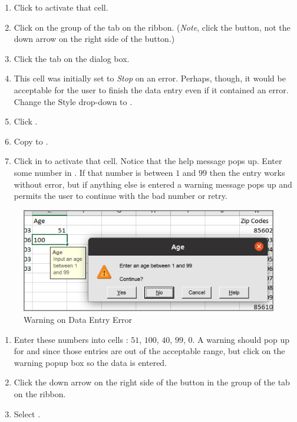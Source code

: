 \begin{enumerate}[resume]	
	\item Click  to activate that cell.
	\item Click  on the  group of the  tab on the ribbon. (\textit{Note}, click the button, not the down arrow on the right side of the button.)
	\item Click the  tab on the  dialog box. 
	\item This cell was initially set to \textit{Stop} on an error. Perhaps, though, it would be acceptable for the user to finish the data entry even if it contained an error. Change the Style drop-down to .
	\item Click .
	\item Copy  to .
	\item Click in  to activate that cell. Notice that the help message pops up. Enter some number in . If that number is between $ 1 $ and $ 99 $ then the entry works without error, but if anything else is entered a warning message pops up and permits the user to continue with the bad number or retry.
\end{enumerate}

\begin{figure}[H]
	\centering
	\includegraphics[width=\maxwidth{.95\linewidth}]{gfx/ch07_fig41}
	\caption{Warning on Data Entry Error}
	\label{07:fig41}
\end{figure}

\begin{enumerate}[resume]	
	\item Enter these numbers into cells : $ 51 $, $ 100 $, $ 40 $, $ 99 $, $ 0 $. A warning should pop up for  and  since those entries are out of the acceptable range, but click  on the warning popup box so the data is entered.
	\item Click the down arrow on the right side of the  button in the  group of the  tab on the ribbon.
	\item Select .
\end{enumerate}

